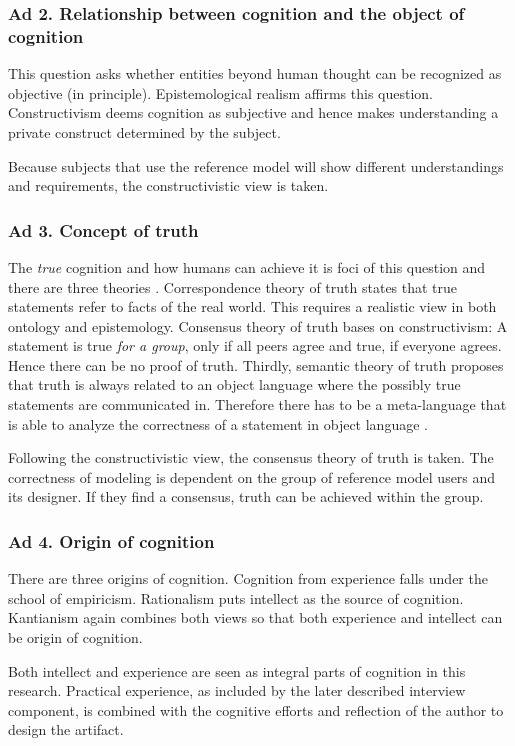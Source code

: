 \subsubsection{Ad 2. Relationship between cognition and the object of cognition}
This question asks whether entities beyond human thought can be recognized as objective (in principle). Epistemological realism affirms this question. Constructivism deems cognition as subjective and hence makes understanding a private construct determined by the subject. 

Because subjects that use the reference model will show different understandings and requirements, the constructivistic view is taken. 

\subsubsection{Ad 3. Concept of truth}
The \textit{true} cognition and how humans can achieve it is foci of this question and there are three theories \cite{habermas1973}. Correspondence theory of truth states that true statements refer to facts of the real world. This requires a realistic view in both ontology and epistemology. Consensus theory of truth bases on constructivism: A statement is true\textit{ for a group}, only if all peers agree and true, if everyone agrees. Hence there can be no proof of truth. Thirdly, semantic theory of truth proposes that truth is always related to an object language where the possibly true statements are communicated in. Therefore there has to be a meta-language that is able to analyze the correctness of a statement in object language \citep{tarski1944}. 

Following the constructivistic view, the consensus theory of truth is taken. The correctness of modeling is dependent on the group of reference model users and its designer. If they find a consensus, truth can be achieved within the group. 

\subsubsection{Ad 4. Origin of cognition}
There are three origins of cognition. Cognition from experience falls under the school of empiricism. Rationalism puts intellect as the source of cognition. Kantianism again combines both views so that both experience and intellect can be origin of cognition. 

Both intellect and experience are seen as integral parts of cognition in this research. Practical experience, as included by the later described interview component, is combined with the cognitive efforts and reflection of the author to design the artifact.

